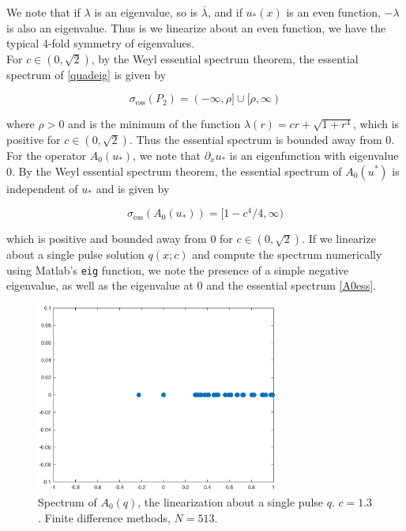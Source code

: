\documentclass[12pt]{article}
\begin{document}
We note that if $\lambda$ is an eigenvalue, so is $\overline{\lambda}$, and if $u_*(x)$ is an even function, $-\lambda$ is also an eigenvalue. Thus is we linearize about an even function, we have the typical 4-fold symmetry of eigenvalues.\\

For $c \in (0, \sqrt{2})$, by the Weyl essential spectrum theorem, the essential spectrum of \eqref{quadeig} is given by

\begin{equation}\label{ess}
\sigma_{\text{ess}}(P_2) = (-\infty, \rho] \cup [\rho, \infty)
\end{equation}

where $\rho > 0$ and is the minimum of the function $\lambda(r) = c r + \sqrt{1 + r^4}$, which is positive for $c \in (0, \sqrt{2})$. Thus the essential spectrum is bounded away from 0.\\

For the operator $A_0(u_*)$, we note that $\partial_x u_*$ is an eigenfunction with eigenvalue 0. By the Weyl essential spectrum theorem, the essential spectrum of $A_0(u^*)$ is independent of $u_*$ and is given by

\begin{equation}\label{A0ess}
\sigma_{\text{ess}}(A_0(u_*)) = [1 - c^4/4, \infty)
\end{equation}

which is positive and bounded away from 0 for $c \in (0, \sqrt{2})$. If we linearize about a single pulse solution $q(x; c)$ and compute the spectrum numerically using Matlab's \texttt{eig} function, we note the presence of a simple negative eigenvalue, as well as the eigenvalue at 0 and the essential spectrum \eqref{A0ess}.

\begin{figure}[H]
\centering
\includegraphics[width=8cm]{specA0.eps}
\caption{Spectrum of $A_0(q)$, the linearization about a single pulse $q$. $c = 1.3$. Finite difference methods, $N = 513$.}
\end{figure}
\end{document}
